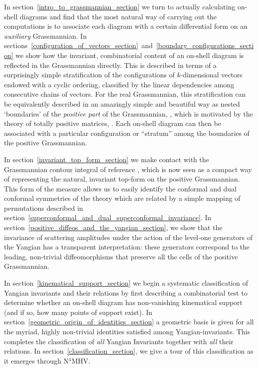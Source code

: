 \documentclass[12pt,hyperref,compress]{JHEP3}
\begin{document}
In \mbox{section \ref{intro_to_grassmannian_section}} we turn to actually calculating on-shell diagrams and find that the most natural way of carrying out the computations is to associate each diagram with a certain differential form on an {\it auxiliary} Grassmannian. In \mbox{sections \ref{configuration_of_vectors_section} and \ref{boundary_configurations_section}} we show how the invariant, combinatorial content of an on-shell diagram is reflected in the Grassmannian directly. This is described in terms of a surprisingly simple stratification of the configurations of $k$-dimensional vectors endowed with a cyclic ordering, classified by the linear dependencies among consecutive chains of vectors. For the real Grassmannian, this stratification can be equivalently described in an amazingly simple and beautiful way as nested `boundaries' of the {\it positive part} of the Grassmannian, \cite{Lusztig::1998}, which is motivated by the theory of totally positive matrices, \cite{GKr,Sch,L2}. Each on-shell diagram can then be associated with a particular configuration or ``stratum'' among the boundaries of the positive Grassmannian.

In \mbox{section \ref{invariant_top_form_section}} we make contact with the Grassmannian contour integral of reference \cite{ArkaniHamed:2009dn}, which is now seen as a compact way of representing the natural, invariant top-form on the
positive Grassmannian. This form of the measure allows us to easily identify the conformal and dual conformal symmetries of the theory which are related by a simple mapping of permutations described in \mbox{section \ref{superconformal_and_dual_superconformal_invariance}}. In \mbox{section \ref{positive_diffeos_and_the_yangian_section}}, we show that the invariance of scattering amplitudes under the action of the level-one generators of the Yangian has a transparent  interpretation: these generators correspond to the leading, non-trivial diffeomorphisms that preserve all the cells of the positive Grassmannian.



In \mbox{section \ref{kinematical_support_section}} we begin a systematic classification of Yangian invariants and their relations by first describing a combinatorial test to determine whether an on-shell diagram has non-vanishing kinematical support (and if so, how many points of support exist). In \mbox{section \ref{geometric_origin_of_identities_section}} a geometric basis is given for all the myriad, highly non-trivial identities satisfied among Yangian-invariants. This completes the classification of {\it all} Yangian Invariants together with {\it all} their relations. In \mbox{section \ref{classification_section}}, we give a tour of this classification as it emerges through N$^4$MHV.
\end{document}
